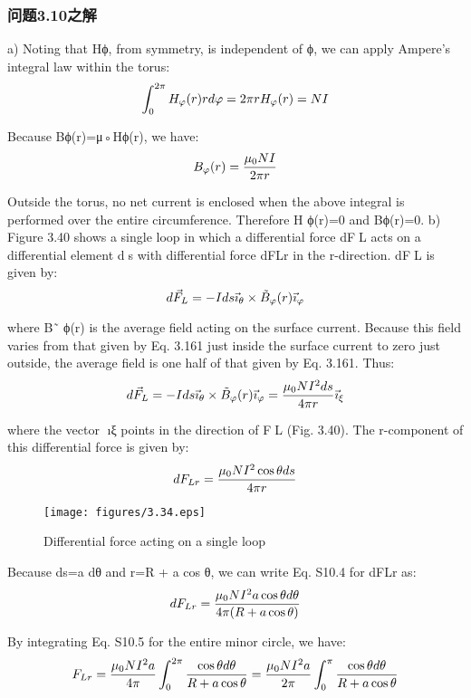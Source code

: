 \subsubsection{问题3.10之解}
a) Noting that Hϕ, from symmetry, is independent of ϕ, we can apply Ampere’s
integral law within the torus:
$$\int_{0}^{2\pi}H_{\varphi}(r)rd\varphi=2\pi rH_{\varphi}(r)=NI\\%
$$

Because Bϕ(r)=μ◦Hϕ(r), we have:
$$B_{\varphi}(r)=\frac{\mu_{0}NI}{2\pi r}\\%
$$

Outside the torus, no net current is enclosed when the above integral is performed
over the entire circumference. Therefore H
ϕ(r)=0 and Bϕ(r)=0.
b) Figure 3.40 shows a single loop in which a differential force dFL acts on a
differential element ds with differential force dFLr in the r-direction.
dFL is given by:
$$
d\vec{F}_{L}=-Ids\vec{\imath}_{\theta}\times\tilde{B}_{\varphi}(r)\vec{\imath}_{\varphi}\\%
$$

where B˜
ϕ(r) is the average field acting on the surface current. Because this field
varies from that given by Eq. 3.161 just inside the surface current to zero just
outside, the average field is one half of that given by Eq. 3.161. Thus:
$$d\vec{F}_{L}=-Ids\vec{\imath}_{\theta}\times\tilde{B}_{\varphi}(r)\vec{\imath}_{\varphi}=\frac{\mu_{0}NI^{2}ds}{4\pi r}\vec{\imath}_{\xi}\\%
$$

where the vector ıξ points in the direction of FL (Fig. 3.40). The r-component of
this differential force is given by:
$$
dF_{Lr}=\frac{\mu_{0}NI^{2}\cos\theta ds}{4\pi r}\\%
$$
\begin{figure}[htbp]
	\centering
	\texttt{[image: figures/3.34.eps]}
	\caption{Differential force acting on a single loop}
\end{figure}

Because ds=a dθ and r=R + a cos θ, we can write Eq. S10.4 for dFLr as:
$$dF_{Lr}=\frac{\mu_{0}NI^{2}a\cos\theta d\theta}{4\pi(R+a\cos\theta)}\\%
$$

By integrating Eq. S10.5 for the entire minor circle, we have:
$$F_{Lr}=\frac{\mu_{0}NI^{2}a}{4\pi}\int_{0}^{2\pi}\frac{\cos\theta d\theta}{R+a\cos\theta}=\frac{\mu_{0}NI^{2}a}{2\pi}\int_{0}^{\pi}\frac{\cos\theta d\theta}{R+a\cos\theta}\\%
$$

